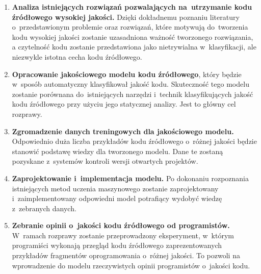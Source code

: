 \documentclass[twoside]{praca}
\begin{document}
\begin{enumerate}
    \item \textbf{Analiza istniejących rozwiązań pozwalających na~utrzymanie kodu źródłowego wysokiej jakości.} Dzięki dokładnemu poznaniu literatury o~przedstawionym problemie oraz rozwiązań, które motywują do~tworzenia kodu wysokiej jakości zostanie uzasadniona ważność tworzonego rozwiązania, a czytelność kodu zostanie przedstawiona jako nietrywialna w~klasyfikacji, ale niezwykle istotna cecha kodu źródłowego.
    \item \textbf{Opracowanie jakościowego modelu kodu źródłowego}, który będzie w~sposób automatyczny klasyfikował jakość kodu. Skuteczność tego modelu zostanie porównana do~istniejących narzędzi i~technik klasyfikujących jakość kodu źródłowego przy użyciu jego statycznej analizy. Jest to główny cel rozprawy.
    \item \textbf{Zgromadzenie danych treningowych dla jakościowego modelu.} Odpowiednio duża liczba przykładów kodu źródłowego o~różnej jakości będzie stanowić podstawę wiedzy dla tworzonego modelu. Dane te zostaną pozyskane z~systemów kontroli wersji otwartych projektów.
    \item \textbf{Zaprojektowanie i~implementacja modelu.} Po dokonaniu rozpoznania istniejących metod uczenia maszynowego zostanie zaprojektowany i~zaimplementowany odpowiedni model potrafiący wydobyć wiedzę z~zebranych danych.
    \item \textbf{Zebranie opinii o~jakości kodu źródłowego od programistów.} W~ramach rozprawy zostanie przeprowadzony eksperyment, w~którym programiści wykonają przegląd kodu źródłowego zaprezentowanych przykładów fragmentów oprogramowania o~różnej jakości. To pozwoli na wprowadzenie do modelu rzeczywistych opinii programistów o~jakości kodu.
    

\end{enumerate}
\end{document}

